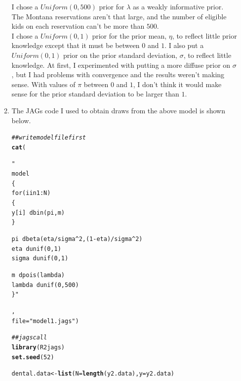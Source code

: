 \documentclass[12pt]{article}\usepackage[]{graphicx}\usepackage[]{color}
\makeatletter
\newcommand{\hlnum}[1]{\textcolor[rgb]{0.686,0.059,0.569}{#1}}%
\newcommand{\hlstr}[1]{\textcolor[rgb]{0.192,0.494,0.8}{#1}}%
\newcommand{\hlcom}[1]{\textcolor[rgb]{0.678,0.584,0.686}{\textit{#1}}}%
\newcommand{\hlstd}[1]{\textcolor[rgb]{0.345,0.345,0.345}{#1}}%
\newcommand{\hlkwb}[1]{\textcolor[rgb]{0.69,0.353,0.396}{#1}}%
\newcommand{\hlkwc}[1]{\textcolor[rgb]{0.333,0.667,0.333}{#1}}%
\newcommand{\hlkwd}[1]{\textcolor[rgb]{0.737,0.353,0.396}{\textbf{#1}}}%
\newenvironment{kframe}{%
 \def\at@end@of@kframe{}%
 \ifinner\ifhmode%
  \def\at@end@of@kframe{\end{minipage}}%
  \begin{minipage}{\columnwidth}%
 \fi\fi%
 \def\FrameCommand##1{\hskip\@totalleftmargin \hskip-\fboxsep
 \colorbox{shadecolor}{##1}\hskip-\fboxsep
     \hskip-\linewidth \hskip-\@totalleftmargin \hskip\columnwidth}%
 \MakeFramed {\advance\hsize-\width
   \@totalleftmargin\z@ \linewidth\hsize
   \@setminipage}}%
 {\par\unskip\endMakeFramed%
 \at@end@of@kframe}
\newenvironment{knitrout}{}{} %
\makeatother
\begin{document}
\begin{enumerate}
\begin{enumerate}
I chose a $Uniform(0, 500)$ prior for $\lambda$ as a weakly informative prior. The Montana reservations aren't that large, and the number of eligible kids on each reservation can't be more than $500$. \\

I chose a $Uniform(0, 1)$ prior for the prior mean, $\eta$, to reflect little prior knowledge except that it must be between $0$ and $1$. I also put a $Uniform(0, 1)$ prior on the prior standard deviation, $\sigma$, to reflect little knowledge. At first, I experimented with putting a more diffuse prior on $\sigma$, but I had problems with convergence and the results weren't making sense. With values of $\pi$ between $0$ and $1$, I don't think it would make sense for the prior standard deviation to be larger than $1$. 

\item The JAGs code I used to obtain draws from the above model is shown below.

\begin{knitrout}\footnotesize
{}\color{fgcolor}\begin{kframe}
\begin{alltt}
\hlcom{##write model file first}
\hlkwd{cat}\hlstd{(}\hlstr{"
model
\{
for(i in 1:N)
\{
y[i] ~ dbin(pi, m)
\}

pi ~ dbeta(eta/sigma^2, (1-eta)/sigma^2)
eta ~ dunif(0, 1)
sigma ~ dunif(0, 1)

m ~ dpois(lambda)
lambda ~ dunif(0, 500)
\}"}\hlstd{,}
\hlkwc{file}\hlstd{=}\hlstr{"model1.jags"}\hlstd{)}
\end{alltt}
\end{kframe}
\end{knitrout}


\begin{knitrout}\footnotesize
{}\color{fgcolor}\begin{kframe}
\begin{alltt}
\hlcom{##jags call}
\hlkwd{library}\hlstd{(R2jags)}
\hlkwd{set.seed}\hlstd{(}\hlnum{52}\hlstd{)}


\hlstd{dental.data} \hlkwb{<-} \hlkwd{list}\hlstd{(}\hlkwc{N}\hlstd{=}\hlkwd{length}\hlstd{(y2.data),} \hlkwc{y}\hlstd{=y2.data)}


\end{alltt}
\end{kframe}
\end{knitrout}
\end{enumerate}
\end{enumerate}
\end{document}
